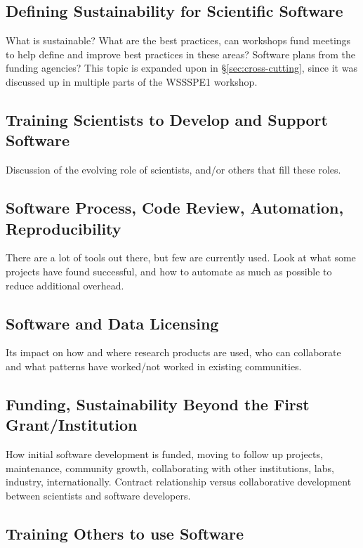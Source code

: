 \documentclass[11pt, oneside]{amsart}
\begin{document}
\subsection{Defining Sustainability for Scientific Software}

What is sustainable? What are the best practices, can workshops fund
meetings to help define and improve best practices in these areas?
Software plans from the funding agencies? This topic is expanded upon
in \S\ref{sec:cross-cutting}, since it was discussed up in multiple
parts of the WSSSPE1 workshop.

\subsection{Training Scientists to Develop and Support Software}

Discussion of the evolving role of scientists, and/or others that fill
these roles.

\subsection{Software Process, Code Review, Automation, Reproducibility}

There are a lot of tools out there, but few are currently used. Look
at what some projects have found successful, and how to automate as
much as possible to reduce additional overhead.

\subsection{Software and Data Licensing}

Its impact on how and where research products are used, who can
collaborate and what patterns have worked/not worked in existing
communities.

\subsection{Funding, Sustainability Beyond the First Grant/Institution}

How initial software development is funded, moving to follow up
projects, maintenance, community growth, collaborating with other
institutions, labs, industry, internationally. Contract relationship
versus collaborative development between scientists and software
developers.

\subsection{Training Others to use Software}
\end{document}
